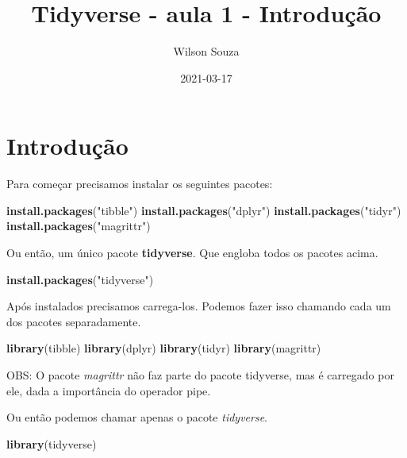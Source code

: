 \documentclass[]{book}
\title{Tidyverse - aula 1 - Introdução}
\author{Wilson Souza}
\date{2021-03-17}
\newenvironment{Shaded}{\begin{snugshade}}{\end{snugshade}}
\newcommand{\KeywordTok}[1]{\textcolor[rgb]{0.13,0.29,0.53}{\textbf{#1}}}
\newcommand{\NormalTok}[1]{#1}
\newcommand{\StringTok}[1]{\textcolor[rgb]{0.31,0.60,0.02}{#1}}
\begin{document}
\maketitle

{
\setcounter{tocdepth}{1}
\tableofcontents
}
\hypertarget{introduuxe7uxe3o}{%
\chapter{Introdução}\label{introduuxe7uxe3o}}

Para começar precisamos instalar os seguintes pacotes:

\begin{Shaded}
\begin{Highlighting}[]
\KeywordTok{install.packages}\NormalTok{(}\StringTok{"tibble"}\NormalTok{)}
\KeywordTok{install.packages}\NormalTok{(}\StringTok{"dplyr"}\NormalTok{)}
\KeywordTok{install.packages}\NormalTok{(}\StringTok{"tidyr"}\NormalTok{)}
\KeywordTok{install.packages}\NormalTok{(}\StringTok{"magrittr"}\NormalTok{)}
\end{Highlighting}
\end{Shaded}

Ou então, um único pacote \textbf{tidyverse}. Que engloba todos os pacotes acima.

\begin{Shaded}
\begin{Highlighting}[]
\KeywordTok{install.packages}\NormalTok{(}\StringTok{"tidyverse"}\NormalTok{)}
\end{Highlighting}
\end{Shaded}

Após instalados precisamos carrega-los. Podemos fazer isso chamando cada um dos pacotes separadamente.

\begin{Shaded}
\begin{Highlighting}[]
\KeywordTok{library}\NormalTok{(tibble)}
\KeywordTok{library}\NormalTok{(dplyr)}
\KeywordTok{library}\NormalTok{(tidyr)}
\KeywordTok{library}\NormalTok{(magrittr)}
\end{Highlighting}
\end{Shaded}

OBS: O pacote \emph{magrittr} não faz parte do pacote tidyverse, mas é carregado por ele, dada a importância do operador pipe.

Ou então podemos chamar apenas o pacote \emph{tidyverse}.

\begin{Shaded}
\begin{Highlighting}[]
\KeywordTok{library}\NormalTok{(tidyverse)}
\end{Highlighting}
\end{Shaded}
\end{document}
